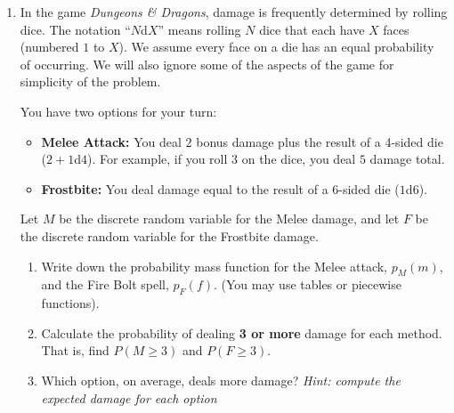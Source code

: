 \documentclass[11pt]{article}
\begin{document}
\begin{enumerate}
\item In the game \textit{Dungeons \& Dragons}, damage is frequently determined by rolling dice. The notation ``$N$d$X$'' means rolling $N$ dice that each have $X$ faces (numbered $1$ to $X$). We assume every face on a die has an equal probability of occurring. We will also ignore some of the aspects of the game for simplicity of the problem.

You have two options for your turn:
\begin{itemize}
    \item \textbf{Melee Attack:} You deal $2$ bonus damage plus the result of a 4-sided die ($2 + 1$d$4$). For example, if you roll $3$ on the dice, you deal $5$ damage total.
    \item \textbf{Frostbite:} You deal damage equal to the result of a 6-sided die ($1$d$6$).
\end{itemize}

Let $M$ be the discrete random variable for the Melee damage, and let $F$ be the discrete random variable for the Frostbite damage.

\begin{enumerate}
    \item Write down the probability mass function for the Melee attack, $p_M(m)$, and the Fire Bolt spell, $p_F(f)$. (You may use tables or piecewise functions).

    \vfill
    \vfill

    \item Calculate the probability of dealing \textbf{3 or more} damage for each method. That is, find $P(M \geq 3)$ and $P(F \geq 3)$.

    \vfill
    \vfill

    \item Which option, on average, deals more damage? \textit{Hint: compute the expected damage for each option}

    \vfill

    \vfill

\end{enumerate}


\newpage



\end{enumerate}
\end{document}
